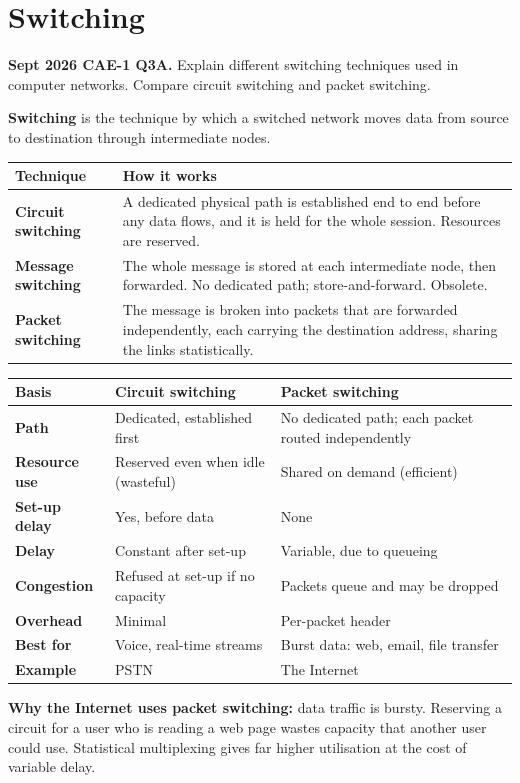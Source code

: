 \documentclass[11pt,a4paper]{article}
\begin{document}
\section{Switching}

\begin{pyqbox}
\textbf{Sept 2026 CAE-1 Q3A.} Explain different switching techniques used in computer networks. Compare circuit switching and packet switching.
\end{pyqbox}

\begin{solbox}
\textbf{Switching} is the technique by which a switched network moves data from source to destination through intermediate nodes.

\begin{center}\small
\begin{tabularx}{\textwidth}{>{\bfseries}p{} X}
\toprule Technique & How it works\\
\midrule
Circuit switching & A dedicated physical path is established end to end before any data flows, and it is held for the whole session. Resources are reserved.\\
Message switching & The whole message is stored at each intermediate node, then forwarded. No dedicated path; store-and-forward. Obsolete.\\
Packet switching & The message is broken into packets that are forwarded independently, each carrying the destination address, sharing the links statistically.\\
\bottomrule
\end{tabularx}
\end{center}

\begin{center}\small
\begin{tabularx}{\textwidth}{>{\bfseries}p{} X X}
\toprule Basis & Circuit switching & Packet switching\\
\midrule
Path & Dedicated, established first & No dedicated path; each packet routed independently\\
Resource use & Reserved even when idle (wasteful) & Shared on demand (efficient)\\
Set-up delay & Yes, before data & None\\
Delay & Constant after set-up & Variable, due to queueing\\
Congestion & Refused at set-up if no capacity & Packets queue and may be dropped\\
Overhead & Minimal & Per-packet header\\
Best for & Voice, real-time streams & Burst data: web, email, file transfer\\
Example & PSTN & The Internet\\
\bottomrule
\end{tabularx}
\end{center}

\textbf{Why the Internet uses packet switching:} data traffic is bursty. Reserving a circuit for a user who is reading a web page wastes capacity that another user could use. Statistical multiplexing gives far higher utilisation at the cost of variable delay.
\end{solbox}
\end{document}

